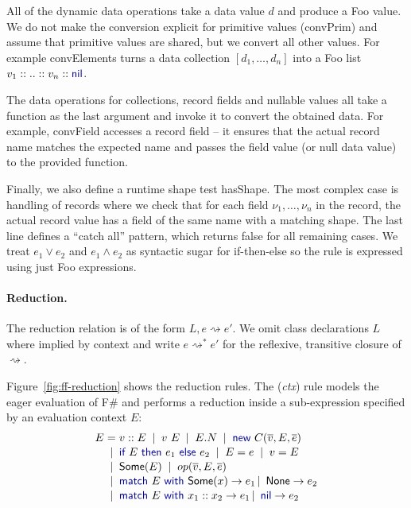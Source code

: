 \documentclass[10pt,preprint,blind,clearpagebib]{sigplanconf}
\newcommand{\kvd}[1]{\textnormal{\textcolor{kvdclr}{\sffamily #1}}}
\newcommand{\ident}[1]{\textnormal{\sffamily #1}}
\newcommand{\lsep}[0]{\;\; | \;\;}
\newcommand{\narrow}[1]{\hspace{-0.7em} #1 \hspace{-0.7em}}
\newcommand{\reduce}{\rightsquigarrow}
\begin{document}
All of the dynamic data operations take a data value $d$ and produce a Foo value. We do not 
make the conversion explicit for primitive values (\ident{convPrim}) and assume that primitive
values are shared, but we convert all other values. For example \ident{convElements} turns a 
data collection $[d_1, \ldots, d_n]$ into a Foo list $v_1 :: .. :: v_n :: \kvd{nil}$.

The data operations for collections, record fields and nullable values all take a function
as the last argument and invoke it to convert the obtained data. For example, \ident{convField} 
accesses a record field -- it ensures that the actual record name matches the expected name and 
passes the field value (or \kvd{null} data value) to the provided function.

Finally, we also define a runtime shape test \ident{hasShape}.
The most complex case is handling of records where we check that for each field $\nu_1, \ldots, \nu_n$ 
in the record, the actual record value has a field of the same name with a matching shape. The last 
line defines a ``catch all'' pattern, which returns \kvd{false} for all remaining cases. 
We treat $e_1 \vee e_2$ and $e_1 \wedge e_2$ as syntactic sugar for \kvd{if}-\kvd{then}-\kvd{else} so
the rule is expressed using just Foo expressions.


\paragraph{Reduction.}
The reduction relation is of the form $L, e \reduce e'$. We omit class declarations 
$L$ where implied by context and write $e \reduce^{*} e'$ for
the reflexive, transitive closure of $\reduce$. 

Figure~\ref{fig:ff-reduction} shows the reduction rules. The (\emph{ctx}) rule models the eager
evaluation of F\# and performs a reduction inside a sub-expression specified by an evaluation 
context $E$:
%
\begin{equation*}
\begin{array}{rcl}
 E &\narrow{=}& v::E \lsep v~E \lsep E.N \lsep \kvd{new}~C(\overline{v}, E, \overline{e})\\[0.1em]
   &\narrow{|}&  \kvd{if}~E~\kvd{then}~e_1~\kvd{else}~e_2  \lsep E = e \lsep v = E \\[0.1em]
   &\narrow{|}& \ident{Some}(E) \lsep op(\overline{v}, E, \overline{e})\\[0.1em]
   &\narrow{|}& \kvd{match}~E~\kvd{with}~\ident{Some}(x) \rightarrow e_1 \,|\, \ident{None} \rightarrow e_2 \\[0.1em]
   &\narrow{|}& \kvd{match}~E~\kvd{with}~x_1 :: x_2 \rightarrow e_1 \,|\, \kvd{nil} \rightarrow e_2
\end{array} 
\end{equation*}
\end{document}
